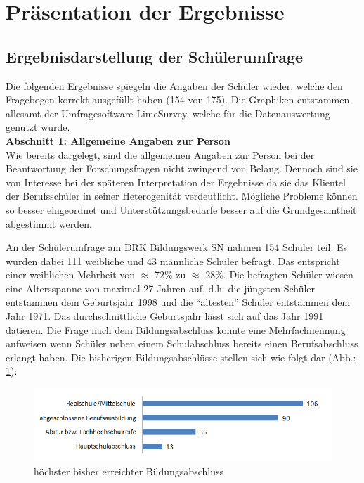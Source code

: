 \section{Präsentation der Ergebnisse}
\label{sec:PräsentationDerErgebnisse}

\subsection{Ergebnisdarstellung der Schülerumfrage}
\label{sec:ErgebnisdarstellungDerSchülerumfrage}

Die folgenden Ergebnisse spiegeln die Angaben der Schüler wieder, welche den Fragebogen korrekt ausgefüllt haben (154 von 175). Die Graphiken entstammen allesamt der Umfragesoftware LimeSurvey, welche für die Datenauswertung genutzt wurde.\\

\noindent
\textbf{Abschnitt 1: Allgemeine Angaben zur Person}\\

\noindent
Wie bereits dargelegt, sind die allgemeinen Angaben zur Person bei der Beantwortung der Forschungsfragen nicht zwingend von Belang. Dennoch sind sie von Interesse bei der späteren Interpretation der Ergebnisse da sie das Klientel der Berufsschüler in seiner Heterogenität verdeutlicht. Mögliche Probleme können so besser eingeordnet und Unterstützungsbedarfe besser auf die Grundgesamtheit abgestimmt werden.

An der Schülerumfrage am DRK Bildungswerk SN nahmen 154 Schüler teil. Es wurden dabei 111 weibliche und 43 männliche
Schüler befragt. Das entspricht einer weiblichen Mehrheit von $\approx$ 72\% zu $\approx$ 28\%. Die befragten Schüler wiesen eine Altersspanne von maximal 27 Jahren auf, d.h. die jüngsten Schüler entstammen dem Geburtsjahr 1998 und die "`ältesten"' Schüler entstammen dem Jahr 1971. Das durchschnittliche Geburtsjahr lässt sich auf das Jahr 1991 datieren. Die Frage nach dem Bildungsabschluss konnte eine Mehrfachnennung aufweisen wenn Schüler neben einem Schulabschluss bereits einen Berufsabschluss erlangt haben. Die bisherigen Bildungsabschlüsse stellen sich wie folgt dar (Abb.: \ref{fig:Hoechster-bisher-erreichter-Bildungsabschluss}):

\begin{figure}[ht]
	\centering
		\includegraphics[width=1.0\textwidth]{images/Hoechster-bisher-erreichter-Bildungsabschluss.png}
	\caption{höchster bisher erreichter Bildungsabschluss}
	\label{fig:Hoechster-bisher-erreichter-Bildungsabschluss}
\end{figure}


